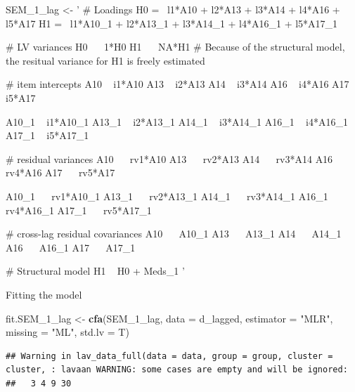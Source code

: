 \documentclass[]{article}
\newenvironment{Shaded}{\begin{snugshade}}{\end{snugshade}}
\newcommand{\KeywordTok}[1]{\textcolor[rgb]{0.13,0.29,0.53}{\textbf{#1}}}
\newcommand{\DataTypeTok}[1]{\textcolor[rgb]{0.13,0.29,0.53}{#1}}
\newcommand{\StringTok}[1]{\textcolor[rgb]{0.31,0.60,0.02}{#1}}
\newcommand{\NormalTok}[1]{#1}
\begin{document}
\begin{Shaded}
\begin{Highlighting}[]
\NormalTok{SEM_1_lag <-}\StringTok{ '}
\StringTok{# Loadings}
\StringTok{H0 =~ l1*A10 +   l2*A13 +   l3*A14 +   l4*A16 +   l5*A17}
\StringTok{H1 =~ l1*A10_1 + l2*A13_1 + l3*A14_1 + l4*A16_1 + l5*A17_1}

\StringTok{# LV variances}
\StringTok{H0 ~~ 1*H0}
\StringTok{H1 ~~ NA*H1 # Because of the structural model, the resitual variance for H1 is freely estimated}

\StringTok{# item intercepts}
\StringTok{A10 ~ i1*A10}
\StringTok{A13 ~ i2*A13}
\StringTok{A14 ~ i3*A14}
\StringTok{A16 ~ i4*A16}
\StringTok{A17 ~ i5*A17}

\StringTok{A10_1 ~ i1*A10_1}
\StringTok{A13_1 ~ i2*A13_1}
\StringTok{A14_1 ~ i3*A14_1}
\StringTok{A16_1 ~ i4*A16_1}
\StringTok{A17_1 ~ i5*A17_1}

\StringTok{# residual variances}
\StringTok{A10 ~~ rv1*A10}
\StringTok{A13 ~~ rv2*A13}
\StringTok{A14 ~~ rv3*A14}
\StringTok{A16 ~~ rv4*A16}
\StringTok{A17 ~~ rv5*A17}

\StringTok{A10_1 ~~ rv1*A10_1}
\StringTok{A13_1 ~~ rv2*A13_1}
\StringTok{A14_1 ~~ rv3*A14_1}
\StringTok{A16_1 ~~ rv4*A16_1}
\StringTok{A17_1 ~~ rv5*A17_1}

\StringTok{# cross-lag residual covariances}
\StringTok{A10 ~~ A10_1}
\StringTok{A13 ~~ A13_1}
\StringTok{A14 ~~ A14_1}
\StringTok{A16 ~~ A16_1}
\StringTok{A17 ~~ A17_1}

\StringTok{# Structural model}
\StringTok{H1 ~ H0 + Meds_1}
\StringTok{'}
\end{Highlighting}
\end{Shaded}

Fitting the model

\begin{Shaded}
\begin{Highlighting}[]
\NormalTok{fit.SEM_1_lag <-}\StringTok{ }
\StringTok{  }\KeywordTok{cfa}\NormalTok{(SEM_1_lag, }
      \DataTypeTok{data =}\NormalTok{ d_lagged,}
      \DataTypeTok{estimator =} \StringTok{"MLR"}\NormalTok{,}
      \DataTypeTok{missing =} \StringTok{"ML"}\NormalTok{,}
      \DataTypeTok{std.lv =}\NormalTok{ T)}
\end{Highlighting}
\end{Shaded}

\begin{verbatim}
## Warning in lav_data_full(data = data, group = group, cluster = cluster, : lavaan WARNING: some cases are empty and will be ignored:
##   3 4 9 30
\end{verbatim}
\end{document}
